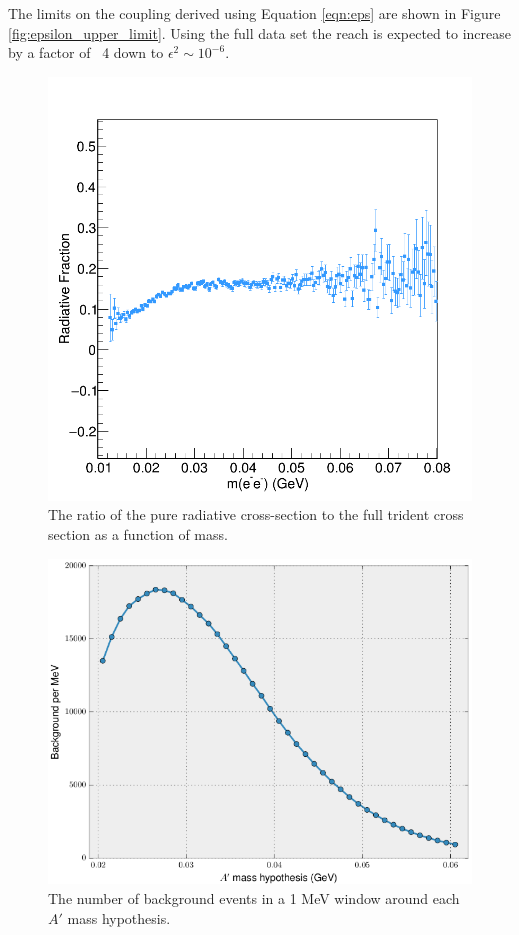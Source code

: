 The limits on the coupling derived using Equation \ref{eqn:eps}
are shown in Figure \ref{fig:epsilon_upper_limit}. Using the full data set
the reach is expected to increase by a factor of ~4 down to $\epsilon^2 \sim 10^{-6}$.
\begin{figure}[ht]
    \centering
    \includegraphics[width=.8\textwidth]{images/rad_frac.png}
    \caption{The ratio of the pure radiative cross-section to the full trident 
             cross section as a function of mass.}
    \label{fig:rad_frac}
\end{figure}
\begin{figure}[hb]
    \centering
    \includegraphics[width=\textwidth]{images/bkg_mev.png}
    \caption{The number of background events in a 1 MeV window around each $A'$ mass hypothesis.}
    \label{fig:background_mev}
\end{figure}
